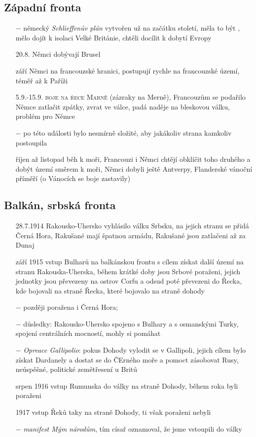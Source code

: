 \documentclass{article}
\begin{document}
\subsection*{Západní fronta}
\begin{itemize}
    \vspace{-0.5em}
    \setlength\itemsep{0.15em}
    \item[$-$] německý \textit{Schlieffenův plán} vytvořen už na začátku století, měla to být , mělo dojít k isolaci Velké Británie, chtěli docílit k dobytí Evropy
    \item[20.8.] Němci dobývají Brusel
    \item[září] Němci na francouzské hranici, postupují rychle na francouzské území, téměř až k Paříži
    \item[5.9.-15.9.] \textsc{boje na řece Marně} (zázraky na Merně), Francouzům se podařilo Němce zatlačit zpátky, zvrat ve válce, padá naděje na bleskovou válku, problém pro Němce
    \item[$-$] po této události bylo nesmírně složité, aby jakákoliv strana kamkoliv postoupila
    \item[říjen až listopad] běh k moři, Francouzi i Němci chtějí obklíčit toho druhého a dobýt území směrem k moři, Němci dobyli ještě Antverpy, Flanderské vánoční příměří (o Vánocích se boje zastavily)
\end{itemize}

\subsection*{Balkán, srbská fronta}
\begin{itemize}
    \vspace{-0.5em}
    \setlength\itemsep{0.15em}
    \item[28.7.1914] Rakousko-Uhersko vyhlásilo válku Srbsku, na jejich stranu se přidá Černá Hora, Rakušané mají špatnou armádu, Rakušané jsou zatlačeni až za Dunaj
    \item[září 1915] vstup Bulharů na balkánskou frontu s cílem získat další území na stranu Rakouska-Uherska, během krátké doby jsou Srbové poraženi, jejich jednotky jsou převezeny na ostrov Corfu a odsud poté převezeni do Řecka, kde bojovali na straně   Řecka, které bojovalo na straně dohody
    \item[$-$] později poražena i Černá Hora;
    \item[$-$] důsledky: Rakousko-Uhersko  spojeno s Bulhary a s osmanskými Turky, spojení centrálních mocností, mohly si pomáhat
    \item[$-$] \textit{Opreace Gallipolio}: pokus Dohody vylodit se v Gallipoli, jejich cílem bylo získat Dardanely a dostat se do ČErného moře a pomoct zásobovat Rusy, neúspěšné, politické zemětřesení u Britů
    \item[srpen 1916] vstup Rumunska do války na straně Dohody, během roka byli poraženi
    \item[1917] vstup Řeků taky na straně Dohody, ti však poraženi nebyli
    \item[$-$] \textit{manifest Mým národům}, tím císař oznamoval, že jsme vstoupili do války 
\end{itemize}
\end{document}
